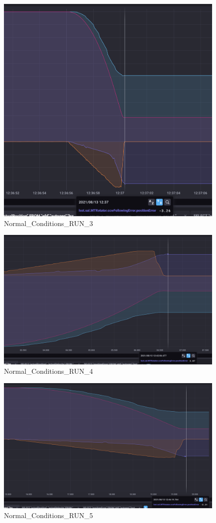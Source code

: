 \documentclass[SE,authoryear,toc, lsstdraft]{lsstdoc}
\begin{document}
\begin{figure}
  \includegraphics[width=\linewidth]{media/followingFault_3.png}
  \caption{Normal\_Conditions\_RUN\_3}
  \label{fig:Normal_Conditions_RUN_3}
\end{figure}

\begin{figure}
  \includegraphics[width=\linewidth]{media/followingFault_4.png}
  \caption{Normal\_Conditions\_RUN\_4}
  \label{fig:Normal_Conditions_RUN_4}
\end{figure}

\begin{figure}
  \includegraphics[width=\linewidth]{media/followingFault_5.png}
  \caption{Normal\_Conditions\_RUN\_5}
  \label{fig:Normal_Conditions_RUN_5}
\end{figure}
\end{document}
